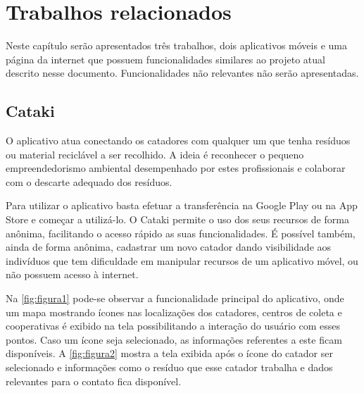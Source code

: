 \documentclass[
	12pt,				%
	openany,			%
	twoside,			%
	a4paper,			%
	english,			%
	french,				%
	spanish,			%
	brazil				%
	]{abntex2}
\begin{document}
\chapter{Trabalhos relacionados}

Neste capítulo serão apresentados três trabalhos, dois aplicativos móveis e uma página da internet que possuem funcionalidades similares ao projeto atual descrito nesse documento. Funcionalidades não relevantes não serão apresentadas.

\section{Cataki}
O aplicativo atua conectando os catadores com qualquer um que tenha resíduos ou material reciclável a ser recolhido. A ideia é reconhecer o pequeno empreendedorismo ambiental desempenhado por estes profissionais e colaborar com o descarte adequado dos resíduos.

Para utilizar o aplicativo basta efetuar a transferência na Google Play\cite{googleplay} ou na App Store\cite{appstore} e começar a utilizá-lo. O Cataki permite o uso dos seus recursos de forma anônima, facilitando o acesso rápido as suas funcionalidades. É possível também, ainda de forma anônima, cadastrar um novo catador dando visibilidade aos indivíduos que tem dificuldade em manipular recursos de um aplicativo móvel, ou não possuem acesso à internet.

Na \autoref{fig:figura1} pode-se observar a funcionalidade principal do aplicativo, onde um mapa mostrando ícones nas localizações dos catadores, centros de coleta e cooperativas é exibido na tela possibilitando a interação do usuário com esses pontos. Caso um ícone seja selecionado, as informações referentes a este ficam disponíveis. A \autoref{fig:figura2} mostra a tela exibida após o ícone do catador ser selecionado e informações como o resíduo que esse catador trabalha e dados relevantes para o contato fica disponível. 
    
\end{document}
